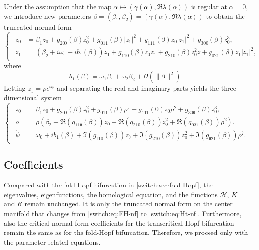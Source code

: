 \begin{subappendices}
Under the assumption that the map $\alpha \mapsto (\gamma(\alpha), \Re \lambda(\alpha))$ is regular at $\alpha=0$, we introduce new parameters $\beta=(\beta_1,\beta_2)=(\gamma(\alpha),\Re \lambda(\alpha))$ to obtain the truncated normal form
%
\begin{equation}
\begin{cases}
\begin{aligned}
\dot{z}_{0} & =\beta_{1}z_{0}+g_{200}(\beta)z_{0}^{2}+g_{011}(\beta)|z_{1}|^{2}+g_{111}(\beta)z_{0}|z_{1}|^{2}+g_{300}(\beta)z_{0}^{3},\\
\dot{z}_{1} & =(\beta_{2}+i\omega_{0}+ib_1(\beta))z_{1}+g_{110}(\beta)z_{0}z_{1}+g_{210}(\beta)z_{0}^{2}z+g_{021}(\beta)z_{1}|z_{1}|^{2},
\end{aligned}
\end{cases}\label{switch:eq:Ht-nf}
\end{equation}
where
\begin{equation}
\label{switch:Eq:b_1_expansion}
b_1(\beta)=\omega_1\beta_1+\omega_2\beta_2+ \mathcal O(\|\beta\|^2).
\end{equation}
Letting $z_{1}=\rho e^{i\psi}$ and separating the real and imaginary parts yields the three dimensional system
\begin{equation}
\begin{cases}
\begin{aligned}
\dot{z}_{0} & =\beta_{1}z_{0}+g_{200}(\beta)z_{0}^{2}+g_{011}(\beta)\rho^{2}+g_{111}(0)z_{0}\rho^{2}+g_{300}(\beta)z_{0}^{3},\\
\dot{\rho} & =\rho\left(\beta_{2}+\Re(g_{110}(\beta))z_{0}+\Re(g_{210}(\beta))z_{0}^{2}+\Re(g_{021}(\beta))\rho^{2}\right),\\
\dot{\psi} & =\omega_{0}+ib_1(\beta)+\Im(g_{110}(\beta))z_{0}+\Im(g_{210}(\beta))z_{0}^{2}+\Im(g_{021}(\beta))\rho^{2}.
\end{aligned}
\end{cases}\label{switch:eq:FH_nf_phi_psi-2}
\end{equation}

\subsection{Coefficients}\label{switch:sec:transcritical-Hopf}
Compared with the fold-Hopf bifurcation in \cref{switch:sec:fold-Hopf}, the eigenvalues, eigenfunctions, the homological equation, and the functions $\mathcal{H}$, $K$ and $R$ remain unchanged. It is only the truncated normal form on the center manifold that changes from \cref{switch:eq:FH-nf} to \cref{switch:eq:Ht-nf}. Furthermore, also the critical normal form coefficients for the transcritical-Hopf bifurcation remain the same as for the fold-Hopf bifurcation. Therefore, we proceed only with the parameter-related equations.


\end{subappendices}

